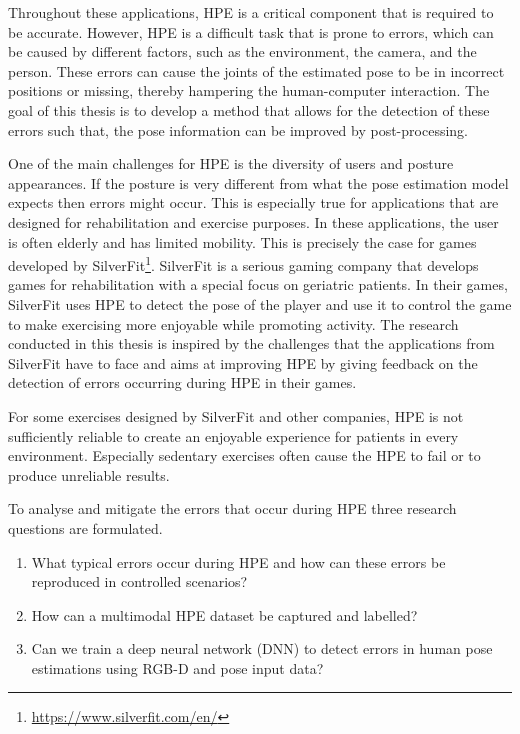 Throughout these applications, HPE is a critical component that is required to be accurate. However, HPE is a difficult task that is prone to errors\cite{HPEIsHard}, which can be caused by different factors, such as the environment, the camera, and the person. These errors can cause the joints of the estimated pose to be in incorrect positions or missing, thereby hampering the human-computer interaction. The goal of this thesis is to develop a method that allows for the detection of these errors such that, the pose information can be improved by post-processing.

One of the main challenges for HPE is the diversity of users and posture appearances. If the posture is very different from what the pose estimation model expects then errors might occur. This is especially true for applications that are designed for rehabilitation and exercise purposes. In these applications, the user is often elderly and has limited mobility. This is precisely the case for games developed by SilverFit\footnote{\url{https://www.silverfit.com/en/}}. SilverFit is a serious gaming company that develops games for rehabilitation with a special focus on geriatric patients. In their games, SilverFit uses HPE to detect the pose of the player and use it to control the game to make exercising more enjoyable while promoting activity. The research conducted in this thesis is inspired by the challenges that the applications from SilverFit have to face and aims at improving HPE by giving feedback on the detection of errors occurring during HPE in their games.

For some exercises designed by SilverFit and other companies, HPE is not sufficiently reliable to create an enjoyable experience for patients in every environment. Especially sedentary exercises often cause the HPE to fail or to produce unreliable results.

To analyse and mitigate the errors that occur during HPE three research questions are formulated. 


\begin{enumerate}[label=(\Alph*)]
  \item What typical errors occur during HPE and how can these errors be reproduced in controlled scenarios?
  \item How can a multimodal HPE dataset be captured and labelled?
  \item Can we train a deep neural network (DNN) to detect errors in human pose estimations using RGB-D and pose input data? 
  \end{enumerate}

